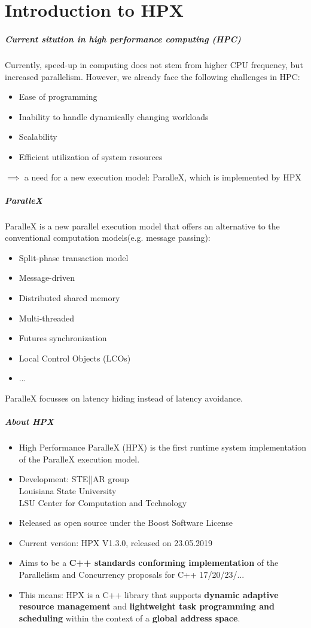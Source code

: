 \part{Introduction to HPX}
\makepart

\begin{frame}
\frametitle{Current sitution in high performance computing (HPC)}
Currently, speed-up in computing does not stem from higher CPU frequency, but increased parallelism.
However, we already face the following challenges in HPC:
\begin{itemize}
  \item Ease of programming
  \item Inability to handle dynamically changing workloads
  \item Scalability
  \item Efficient utilization of system resources
\end{itemize}
\(\implies\) a need for a new execution model: ParalleX, which is implemented by HPX
\end{frame}

\begin{frame}
\frametitle{ParalleX}
ParalleX is a new parallel execution model that offers an alternative to the conventional computation models(e.g. message passing):
\begin{itemize}
  \item Split-phase transaction model
  \item Message-driven
  \item Distributed shared memory
  \item Multi-threaded
  \item Futures synchronization
  \item Local Control Objects (LCOs)
  \item ...
\end{itemize}
ParalleX focusses on latency hiding instead of latency avoidance.
\end{frame}

\begin{frame}
\frametitle{About HPX}
\begin{itemize}
  \item High Performance ParalleX (HPX) is the first runtime system implementation of the ParalleX execution model.
  \item Development: STE||AR group \\ Louisiana State University \\ LSU Center for Computation and Technology
  \item Released as open source under the Boost Software License
  \item Current version: HPX V1.3.0, released on 23.05.2019
  \item Aims to be a \textbf{C++ standards conforming implementation} of the Parallelism and Concurrency proposals for C++ 17/20/23/...
  \item This means: HPX is a C++ library that supports \textbf{dynamic adaptive resource management} and \textbf{lightweight task programming and scheduling} within the context of a \textbf{global address space}. 
\end{itemize}
\end{frame}

